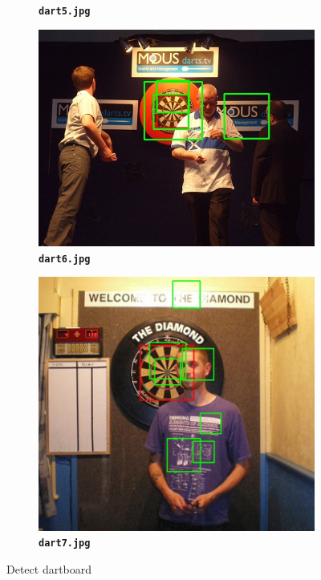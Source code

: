 \documentclass[12pt]{article}
\begin{document}
\begin{figure}[htb]
\begin{subfigure}[b]{.48\linewidth}
		\caption{\textbf{\texttt{dart5.jpg}}}
	\end{subfigure}
	\begin{subfigure}[b]{.48\linewidth}
		\centering
		\includegraphics[width=\linewidth]{task2/result/dart6_detected.jpg}
		\caption{\textbf{\texttt{dart6.jpg}}}
	\end{subfigure}
	\begin{subfigure}[b]{.48\linewidth}
		\centering
		\includegraphics[width=\linewidth]{task2/result/dart7_detected.jpg}
		\caption{\textbf{\texttt{dart7.jpg}}}
	\end{subfigure}
	\caption{Detect dartboard }
	\label{fig:3}
\end{figure}
\end{document}
